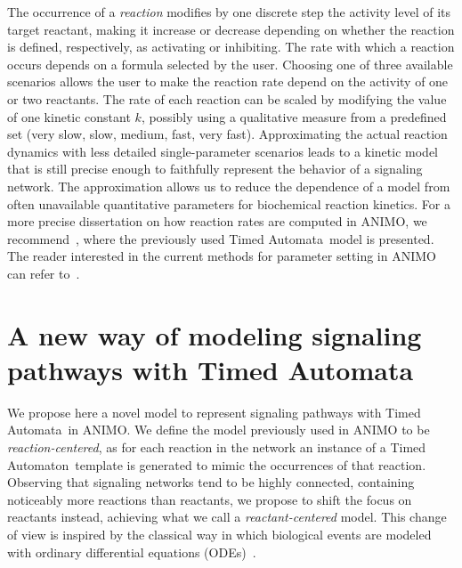 \documentclass{llncs}
\newcommand{\ta}{Timed Automaton}
\newcommand{\tas}{Timed Automata}
\begin{document}
The occurrence of a \emph{reaction} modifies by one discrete step the activity level of its target reactant, making it increase or decrease 
depending on whether the reaction is defined, respectively, as activating or inhibiting.
The rate with which a reaction occurs depends on a formula selected by the user. 
Choosing one of three available scenarios allows the user to make the reaction rate depend on
the activity of one or two reactants.
The rate of each reaction can be scaled by modifying the value of one kinetic constant $k$,
possibly using a qualitative measure from a predefined set ({\sf very slow}, {\sf slow},
{\sf medium}, {\sf fast}, {\sf very fast}).
Approximating the actual reaction dynamics with less detailed single-parameter scenarios
leads to a kinetic model that is still precise enough to faithfully represent the behavior of a signaling network.
The approximation allows us to reduce the dependence of a model from often unavailable quantitative
parameters for biochemical reaction kinetics.
For a more precise dissertation on how reaction rates are computed in ANIMO, we recommend~\cite{animo-ieee},
where the previously used \tas\ model is presented. The reader interested in the current
methods for parameter setting in ANIMO can refer to~\cite{animo-syncop}.




\section{A new way of modeling signaling pathways with \tas}\label{sec:animo-new}
We propose here a novel model to represent signaling pathways with \tas\ in ANIMO.
We define the model previously used in ANIMO to be \emph{reaction-centered}, as for each reaction
in the network an instance of a \ta\ template is generated to mimic
the occurrences of that reaction. Observing that signaling
networks tend to be highly connected, containing noticeably more reactions than reactants,
we propose to shift the focus on reactants instead, achieving what we call a \emph{reactant-centered} model.
This change of view is inspired by the classical way in which biological events are modeled
with ordinary differential equations (ODEs)~\cite{ode-ma-anche-altro}.

\end{document}
